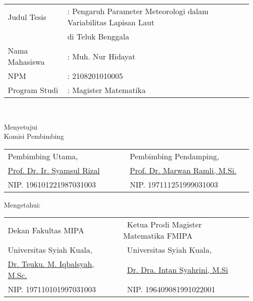 \setcounter{page}{2}
\vspace{1.5pc}

\begin{center}
	\normalsize
	\noindent
	\begin{tabular}{l l l}
		Judul Tesis \verb"  " &: Pengaruh Parameter Meteorologi dalam Variabilitas Lapisan Laut \\ & di Teluk Benggala  \\
		Nama Mahasiswa &: Muh. Nur Hidayat \\
		NPM &: 2108201010005 \\
		Program Studi	&: Magister Matematika \\ 
	\end{tabular} \\
\end{center}

\begin{center}
	\vspace{4cm}
	Menyetujui\\
	Komisi Pembimbing
	
	\vspace{1cm}
	
	\begin{tabular}{l l }
		Pembimbing Utama,\verb"                 " & Pembimbing Pendamping, \verb"            "\\[2.25cm]
		\underline{Prof. Dr. Ir. Syamsul Rizal} & \underline{Prof. Dr. Marwan Ramli, M.Si.}\\
		NIP. 196101221987031003 & NIP. 197111251999031003
	\end{tabular}
\end{center}

\begin{center}
	\vspace{0.5cm}
	Mengetahui:\\%
	
	\vspace{1cm}
	
	\begin{tabular}{l l }
		Dekan Fakultas MIPA\verb"             " & \verb" "Ketua Prodi Magister Matematika FMIPA\\
		Universitas Syiah Kuala, & \verb" "Universitas Syiah Kuala,\\[2.25cm]
		\underline{Dr. Teuku. M. Iqbalsyah, M.Sc.} & \verb" "\underline{Dr. Dra. Intan Syahrini, M.Si}\\
		NIP. 197110101997031003 & \verb" "NIP. 196409081991022001
	\end{tabular}
\end{center}
\vspace{0.3cm}
\begin{center}
	
\end{center}
\thispagestyle{empty}
